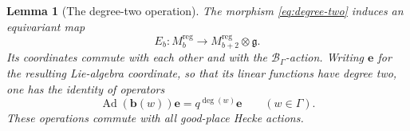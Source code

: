 \documentclass[11pt]{article}
\numberwithin{equation}{section}
\newtheorem{lemma}[theorem]{Lemma}
\theoremstyle{definition}
\theoremstyle{remark}
\newcommand{\g}{\mathfrak g}
\newcommand{\Ad}{\operatorname{Ad}}
\begin{document}
\begin{lemma}[The degree-two operation]\label{lem:glob-degree-two}
The morphism \eqref{eq:degree-two} induces an equivariant map
\[
 E_b:M_b^{\mathrm{reg}}\longrightarrow
                 M_{b+2}^{\mathrm{reg}}\otimes\g.
\]
Its coordinates commute with each other and with the
$\mathscr B_\Gamma$-action.  Writing $\mathbf e$ for the resulting
Lie-algebra coordinate, so that its linear functions have degree two,
one has the identity of operators
\begin{equation}\label{eq:global-relation}
           \Ad(\mathbf b(w))\mathbf e
                         =q^{\deg(w)}\mathbf e
          \qquad(w\in\Gamma).
\end{equation}
These operations commute with all good-place Hecke actions.
\end{lemma}
\end{document}
